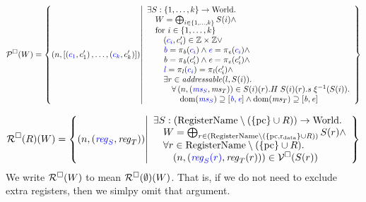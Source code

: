\documentclass[a4paper]{article}
\begin{document}
\[
  \lrp(W) =
    \left\{
    \npair{ [\stpair[.]{c_1}{c'_1}, \dots, \stpair[.]{c_k}{c'_k}] } \middle| 
    \begin{array}{l}
      \exists S : \{1,\dots,k\} \fun \World \ldotp \\
      \quad W = \bigoplus_{i\in\{1,\dots,k\}} S(i)\wedge \\
      \quad\text{for $i \in \{1,\dots,k\}$} \\
      \qquad\stpair[.]{c_i}{c'_i} \in \ints \times \ints \vee \\
      \qquad\src{\baddr} = \pi_\baddr(\src{c_i}) \wedge \src{\eaddr} = \pi_\eaddr(\src{c_i}) \wedge \\
      \qquad\baddr = \pi_\baddr(c_i') \wedge \eaddr = \pi_\eaddr(c_i') \wedge \\
      \qquad\src{\lin} = \pi_\lin(\src{c_i}) = \pi_\lin(c_i') \wedge \\
      \qquad \exists r \in \addressable{l,S(i)} \ldotp\\
      \qquad \quad \forall \npair{\stpair{\ms}{\ms}} \in S(i)(r).H \; S(i)(r).s \; \xi^{-1}(S(i))  \ldotp \\
      \qquad \qquad \dom(\src{\ms_S}) \supseteq [\src{\baddr},\src{\eaddr}] \wedge \dom(\ms_T) \supseteq [\baddr,\eaddr]      
    \end{array}
  \right\}
\]


\[
  \lrr(R)(W) = \left\{ \npair{\stpair{\reg}{\reg}} \middle|
    \begin{array}{l}
      \exists S : (\RegName \setminus (\{\pcreg \} \cup R))\fun \World \ldotp \\
      \quad W = \bigoplus_{r \in (\RegName\setminus (\{\pcreg,\rdata \} \cup R))} S(r) \wedge \\
      \quad \forall r \in \RegName \setminus (\{\pcreg \} \cup R)\ldotp\\
      \qquad\npair{\stpair[.]{\src{\reg_S(r)}}{\reg_T(r)}} \in \lrv(S(r))
    \end{array}
            \right\}
\]
We write $\mathcal{R}^{\square}(W)$ to mean $\mathcal{R}^{\square}(\emptyset)(W)$. That is, if we do not need to exclude extra registers, then we simlpy omit that argument.
\end{document}
